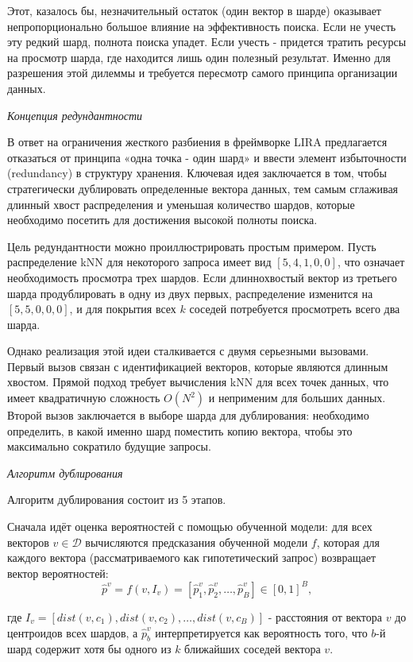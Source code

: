Этот, казалось бы, незначительный остаток (один вектор в шарде) оказывает непропорционально большое влияние на эффективность поиска. Если не учесть эту редкий шард, полнота поиска упадет. Если учесть - придется тратить ресурсы на просмотр шарда, где находится лишь один полезный результат. Именно для разрешения этой дилеммы и требуется пересмотр самого принципа организации данных.


\textit{Концепция редундантности}

В ответ на ограничения жесткого разбиения в фреймворке LIRA предлагается отказаться от принципа «одна точка - один шард» и ввести элемент избыточности (redundancy) в структуру хранения. Ключевая идея заключается в том, чтобы стратегически дублировать определенные вектора данных, тем самым сглаживая длинный хвост распределения и уменьшая количество шардов, которые необходимо посетить для достижения высокой полноты поиска.

Цель редундантности можно проиллюстрировать простым примером. Пусть распределение kNN для некоторого запроса имеет вид $[5, 4, 1, 0, 0]$, что означает необходимость просмотра трех шардов. Если длиннохвостый вектор из третьего шарда продублировать в одну из двух первых, распределение изменится на $[5, 5, 0, 0, 0]$, и для покрытия всех $k$ соседей потребуется просмотреть всего два шарда.

Однако реализация этой идеи сталкивается с двумя серьезными вызовами. Первый вызов связан с идентификацией векторов, которые являются длинным хвостом. Прямой подход требует вычисления kNN для всех точек данных, что имеет квадратичную сложность $O(N^2)$ и неприменим для больших данных. Второй вызов заключается в выборе шарда для дублирования: необходимо определить, в какой именно шард поместить копию вектора, чтобы это максимально сократило будущие запросы.

\textit{Алгоритм дублирования}

Алгоритм дублирования состоит из 5 этапов.

Сначала идёт оценка вероятностей с помощью обученной модели: для всех векторов $v \in \mathcal{D}$ вычисляются предсказания обученной модели $f$, которая для каждого вектора (рассматриваемого как гипотетический запрос) возвращает вектор вероятностей:
$$
\hat{p}^v = f(v, I_v) = [\hat{p}^v_1, \hat{p}^v_2, \dots, \hat{p}^v_B] \in [0, 1]^B,
$$

где $I_v = [dist(v, c_1), dist(v, c_2), \dots, dist(v, c_B)]$ - расстояния от вектора $v$ до центроидов всех шардов, а $\hat{p}^v_b$ интерпретируется как вероятность того, что $b$-й шард содержит хотя бы одного из $k$ ближайших соседей вектора $v$.

